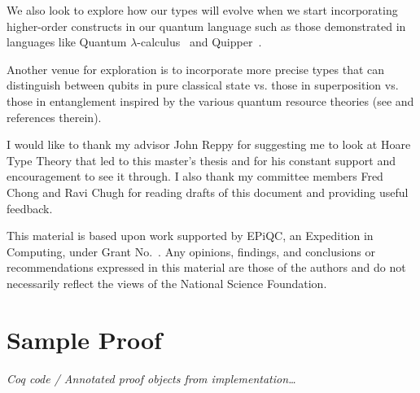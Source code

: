 \documentclass[acmsmall,nonacm,timestamp,review]{acmart}
\begin{document}
We also look to explore how our types will evolve when we start incorporating higher-order constructs in our quantum language such as those demonstrated in languages like Quantum $\lambda$-calculus~\cite{selinger_lambda_2006} and Quipper~\cite{green_quipper:_2013}.

Another venue for exploration is to incorporate more precise types that can distinguish between qubits in pure classical state vs. those in superposition vs. those in entanglement inspired by the various quantum resource theories (see \cite{rand_type_2019} and references therein).

\begin{acks}
	I would like to thank my advisor John Reppy for suggesting me to look at Hoare Type Theory that led to this master's thesis and for his constant support and encouragement to see it through. I also thank my committee members Fred Chong and Ravi Chugh for reading drafts of this document and providing useful feedback.

	This material is based upon work supported by
	EPiQC, an 
	Expedition in Computing, under Grant
	No.~.  Any opinions, findings, and
	conclusions or recommendations expressed in this material are those
	of the authors and do not necessarily reflect the views of the
	National Science Foundation.
\end{acks}

\newpage



\newpage

\appendix
\section{Sample Proof}
\textit{Coq code / Annotated proof objects from implementation\ldots}
\end{document}
